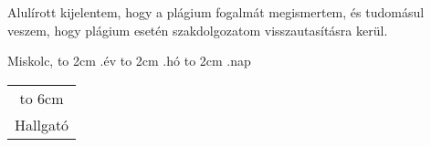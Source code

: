 Alulírott kijelentem, hogy a plágium fogalmát megismertem, és tudomásul veszem, hogy
plágium esetén szakdolgozatom visszautasításra kerül.

\vspace*{3cm}

\noindent Miskolc, \hbox to 2cm{\dotfill} .év \hbox to 2cm{\dotfill} .hó \hbox to 2cm{\dotfill} .nap

\vspace*{3cm}

\hspace*{8cm}\begin{tabular}{c}
    \hbox to 6cm{\dotfill} \\
    Hallgató
\end{tabular}